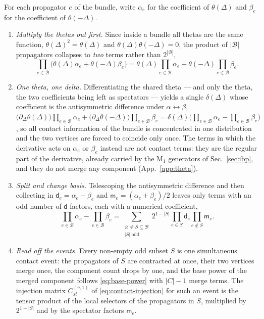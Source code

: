 \documentclass[11pt,a4paper]{article}
\newcommand{\cB}{\mathcal B}
\begin{document}
For each propagator $e$ of the bundle, write $\alpha_e$ for the coefficient of
$\theta(\Delta)$ and $\beta_e$ for the coefficient of $\theta(-\Delta)$.
\begin{enumerate}
  \item \emph{Multiply the thetas out first.} Since inside a bundle all thetas are the same
        function, $\theta(\Delta)^2=\theta(\Delta)$ and $\theta(\Delta)\theta(-\Delta)=0$, the
        product of $|\cB|$ propagators collapses to \emph{two} terms rather than $2^{|\cB|}$,
        \begin{equation}
          \prod_{e\in\cB}\Big(\theta(\Delta)\alpha_e+\theta(-\Delta)\beta_e\Big)
          =\theta(\Delta)\prod_{e\in\cB}\alpha_e
          +\theta(-\Delta)\prod_{e\in\cB}\beta_e .
          \label{eq:bundle-two-terms}
        \end{equation}
  \item \emph{One theta, one delta.} Differentiating the shared theta --- and only the theta, the two
        coefficients being left as spectators --- yields a single
        $\delta(\Delta)$ whose coefficient is the antisymmetric difference under
        $\alpha\leftrightarrow\beta$,
        $\big(\partial_\Delta\theta(\Delta)\big)\prod_{e\in\cB}\alpha_e
        +\big(\partial_\Delta\theta(-\Delta)\big)\prod_{e\in\cB}\beta_e
        =\delta(\Delta)\big(\prod_{e\in\cB}\alpha_e-\prod_{e\in\cB}\beta_e\big)$, so all contact information of
        the bundle is concentrated in one distribution and the two vertices are forced to coincide
        only once. The terms in which the derivative acts on $\alpha_e$ or $\beta_e$ instead are not
        contact terms: they are the regular part of the derivative, already carried by the
        $\text{M}_1$ generators of Sec.~\ref{sec:ibp}, and they do not merge any component
        (App.~\ref{app:theta}).
  \item \emph{Split and change basis.} Telescoping the antisymmetric difference and then collecting
        in $\mathsf d_e=\alpha_e-\beta_e$ and $\mathsf m_e=(\alpha_e+\beta_e)/2$ leaves only terms
        with an odd number of $\mathsf d$ factors, each with a numerical coefficient,
        \begin{equation}
          \prod_{e\in\cB}\alpha_e-\prod_{e\in\cB}\beta_e
          =\sum_{\substack{\varnothing\neq S\subseteq\cB\\|S|\ \mathrm{odd}}}
          2^{1-|S|}\prod_{e\in S}\mathsf d_e\prod_{e\notin S}\mathsf m_e .
          \label{eq:bundle-odd-subsets}
        \end{equation}
  \item \emph{Read off the events.} Every non-empty odd subset $S$ is one simultaneous contact
        event: the propagators of $S$ are contracted at once, their two vertices merge once, the component
        count drops by one, and the base power of the merged component follows
        \eqref{eq:base-power} with $|C|-1$ merge terms. The injection matrix
        $C^{(v,1)}_{st}$ of \eqref{eq:contact-injection} for such an event is the tensor product of
        the local selectors of the propagators in $S$, multiplied by $2^{1-|S|}$ and by the spectator
        factors $\mathsf m_e$.
\end{enumerate}
\end{document}

